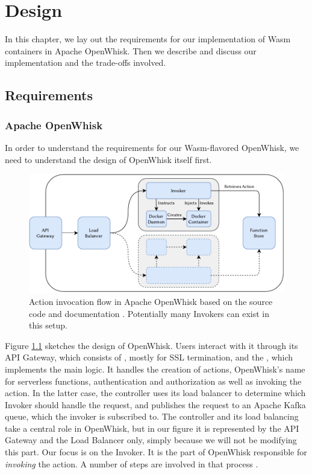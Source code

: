 \chapter{Design}

In this chapter, we lay out the requirements for our implementation of Wasm containers in Apache OpenWhisk. Then we describe and discuss our implementation and the trade-offs involved.

\section{Requirements}

\subsection{Apache OpenWhisk}

In order to understand the requirements for our Wasm-flavored OpenWhisk, we need to understand the design of OpenWhisk itself first.

\begin{figure}
    \includegraphics{figures/OpenWhiskActionInvocationFlow.pdf}
    \caption{Action invocation flow in Apache OpenWhisk based on the source code and documentation \cite{OpenWhiskSystemDesign}. Potentially many Invokers can exist in this setup.}
    \label{fig:openwhisk-action-invocation-flow}
\end{figure}

Figure \ref{fig:openwhisk-action-invocation-flow} sketches the design of OpenWhisk. Users interact with it through its API Gateway, which consists of , mostly for SSL termination, and the , which implements the main logic. It handles the creation of actions, OpenWhisk's name for serverless functions, authentication and authorization as well as invoking the action.
In the latter case, the controller uses its load balancer to determine which Invoker should handle the request, and publishes the request to an Apache Kafka queue, which the invoker is subscribed to. The controller and its load balancing take a central role in OpenWhisk, but in our figure it is represented by the API Gateway and the Load Balancer only, simply because we will not be modifying this part.
Our focus is on the Invoker. It is the part of OpenWhisk responsible for \emph{invoking} the action. A number of steps are involved in that process \cite{OpenWhiskSystemDesign}.

